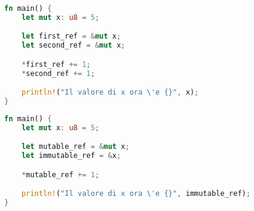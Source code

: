 \begin{lstlisting}[language=Rust, caption={Due reference mutabili alla stessa variabile}, label={borrow:two-mutable}]
fn main() {
    let mut x: u8 = 5;

    let first_ref = &mut x;
    let second_ref = &mut x;

    *first_ref += 1;
    *second_ref += 1;

    println!("Il valore di x ora \'e {}", x);
}
\end{lstlisting}

\begin{lstlisting}[language=Rust, caption={Coesistenza reference mutabile e immutabile}, label={borrow:mut-and-unmut}]
fn main() {
    let mut x: u8 = 5;

    let mutable_ref = &mut x;
    let immutable_ref = &x;

    *mutable_ref += 1;

    println!("Il valore di x ora \'e {}", immutable_ref);
}
\end{lstlisting}

